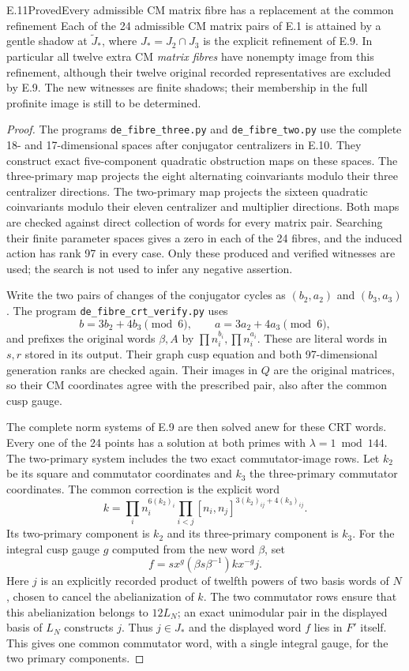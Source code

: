 \begin{statement}{E.11}{Proved}{Every admissible CM matrix fibre has a replacement at the common refinement}
Each of the 24 admissible CM matrix pairs of E.1 is attained by a
gentle shadow at $\widetilde J_*$, where $J_*=J_2\cap J_3$ is the
explicit refinement of E.9. In particular all twelve extra CM
\emph{matrix fibres} have nonempty image from this refinement,
although their twelve original recorded representatives are excluded
by E.9. The new witnesses are finite shadows; their membership in
the full profinite image is still to be determined.
\end{statement}
\begin{proof}
The programs \texttt{de\_fibre\_three.py} and
\texttt{de\_fibre\_two.py} use the complete 18- and 17-dimensional
spaces after conjugator centralizers in E.10. They construct exact
five-component quadratic obstruction maps on these spaces. The
three-primary map projects the eight alternating coinvariants
modulo their three centralizer directions. The two-primary map
projects the sixteen quadratic coinvariants modulo their eleven
centralizer and multiplier directions. Both maps are checked
against direct collection of words for every matrix pair. Searching
their finite parameter spaces gives a zero in each of the 24
fibres, and the induced action has rank 97 in every case. Only
these produced and verified witnesses are used; the search is not
used to infer any negative assertion.

Write the two pairs of changes of the conjugator cycles as
$(b_2,a_2)$ and $(b_3,a_3)$. The program
\texttt{de\_fibre\_crt\_verify.py} uses
\[
 b=3b_2+4b_3\pmod6,\qquad
 a=3a_2+4a_3\pmod6,
\]
and prefixes the original words $\beta,A$ by
$\prod n_i^{b_i},\prod n_i^{a_i}$. These are literal words in
$s,r$ stored in its output. Their graph cusp equation and both
97-dimensional generation ranks are checked again. Their images
in $Q$ are the original matrices, so their CM coordinates agree
with the prescribed pair, also after the common cusp gauge.

The complete norm systems of E.9 are then solved anew for these
CRT words. Every one of the 24 points has a solution at both
primes with $\lambda=1\bmod144$. The two-primary system includes
the two exact commutator-image rows. Let $k_2$ be its square and
commutator coordinates and $k_3$ the three-primary commutator
coordinates. The common correction is the explicit word
\[
 k=\prod_i n_i^{6(k_2)_i}
       \prod_{i<j}[n_i,n_j]^{3(k_2)_{ij}+4(k_3)_{ij}}.
\]
Its two-primary component is $k_2$ and its three-primary component
is $k_3$. For the integral cusp gauge $g$ computed from the new
word $\beta$, set
\[
 f=sx^g(\beta s\beta^{-1})k x^{-g}j.
\]
Here $j$ is an explicitly recorded product of twelfth powers of
two basis words of $N$, chosen to cancel the abelianization of $k$.
The two commutator rows ensure that this abelianization belongs to
$12L_N$; an exact unimodular pair in the displayed basis of $L_N$
constructs $j$. Thus $j\in J_*$ and the displayed word $f$ lies
in $F'$ itself. This gives one common commutator word, with a
single integral gauge, for the two primary components.


\end{proof}
